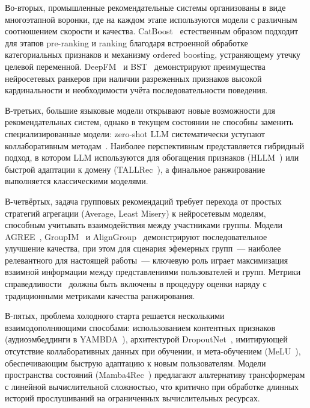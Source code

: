 Во-вторых, промышленные рекомендательные системы организованы в виде многоэтапной воронки, где на каждом этапе используются модели с различным соотношением скорости и качества. CatBoost~\cite{prokhorenkova2018catboost} естественным образом подходит для этапов pre-ranking и ranking благодаря встроенной обработке категориальных признаков и механизму ordered boosting, устраняющему утечку целевой переменной. DeepFM~\cite{guo2017deepfm} и BST~\cite{chen2019bst} демонстрируют преимущества нейросетевых ранкеров при наличии разреженных признаков высокой кардинальности и необходимости учёта последовательности поведения.

В-третьих, большие языковые модели открывают новые возможности для рекомендательных систем, однако в текущем состоянии не способны заменить специализированные модели: zero-shot LLM систематически уступают коллаборативным методам~\cite{kang2024llm_preferences}. Наиболее перспективным представляется гибридный подход, в котором LLM используются для обогащения признаков (HLLM~\cite{chen2024hllm}) или быстрой адаптации к домену (TALLRec~\cite{bao2023tallrec}), а финальное ранжирование выполняется классическими моделями.

В-четвёртых, задача групповых рекомендаций требует перехода от простых стратегий агрегации (Average, Least Misery) к нейросетевым моделям, способным учитывать взаимодействия между участниками группы. Модели AGREE~\cite{cao2018agree}, GroupIM~\cite{sankar2020groupim} и AlignGroup~\cite{xu2024aligngroup} демонстрируют последовательное улучшение качества, при этом для сценария эфемерных групп~--- наиболее релевантного для настоящей работы~--- ключевую роль играет максимизация взаимной информации между представлениями пользователей и групп. Метрики справедливости~\cite{jin2023fairness_survey} должны быть включены в процедуру оценки наряду с традиционными метриками качества ранжирования.

В-пятых, проблема холодного старта решается несколькими взаимодополняющими способами: использованием контентных признаков (аудиоэмбеддинги в YAMBDA~\cite{yambda2025}), архитектурой DropoutNet~\cite{volkovs2017dropoutnet}, имитирующей отсутствие коллаборативных данных при обучении, и мета-обучением (MeLU~\cite{lee2019melu}), обеспечивающим быструю адаптацию к новым пользователям. Модели пространства состояний (Mamba4Rec~\cite{liu2024mamba4rec}) предлагают альтернативу трансформерам с линейной вычислительной сложностью, что критично при обработке длинных историй прослушиваний на ограниченных вычислительных ресурсах.


